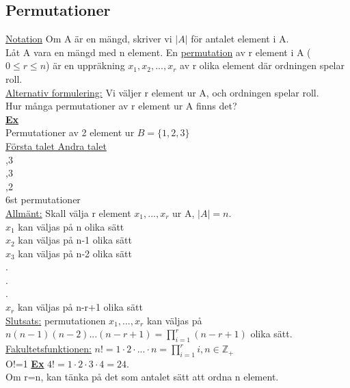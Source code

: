 \documentclass{article}
\begin{document}
         \subsection{Permutationer}
            \underline{Notation} Om A är en mängd, skriver vi $|A|$ för antalet element i A.\\
            Låt A vara en mängd med n element. En \underline{permutation} av r element i A ($0\leq r\leq n$) är en uppräkning $x_{1}, x_{2}, ..., x_{r}$ av r olika element där ordningen spelar roll.\\
            \underline{Alternativ formulering:} Vi väljer r element ur A, och ordningen spelar roll.\\
            Hur många permutationer av r element ur A finns det?\\
            \underline{\textbf{Ex}}\\
            \indent Permutationer av 2 element ur $B=\{1,2,3\}$\\
            \indent \underline{Första talet Andra talet}\\
            \indent {} \indent \indent {},3\\
            \indent {} \indent \indent {},3\\
            \indent {} \indent \indent {},2\\
            \indent 6st permutationer\\
            \underline{Allmänt:} Skall välja r element $x_{1}, ..., x_{r}$ ur A, $|A|=n$.\\
            \indent $x_{1}$ kan väljas på n olika sätt\\
            \indent $x_{2}$ kan väljas på n-1 olika sätt\\
            \indent $x_{3}$ kan väljas på n-2 olika sätt\\
            \indent .\\
            \indent .\\
            \indent .\\
            \indent $x_{r}$ kan väljas på n-r+1 olika sätt\\
            \underline{Slutsats:} permutationen $x_{1}, ..., x_{r}$ kan väljas på $n(n-1)(n-2)...(n-r+1)=\prod_{i=1}^{r}(n-r+1)$ olika sätt.\\
            \underline{Fakultetsfunktionen:} $n!=1\cdot 2 \cdot ... \cdot n=\prod_{i=1}^{r}i, n\in \mathbb{Z}_{+}$\\
            \indent O!=1
            \underline{\textbf{Ex}}
            \indent $4!=1\cdot 2\cdot 3\cdot 4 = 24$.\\
            Om r=n, kan tänka på det som antalet sätt att ordna n element.
\end{document}
